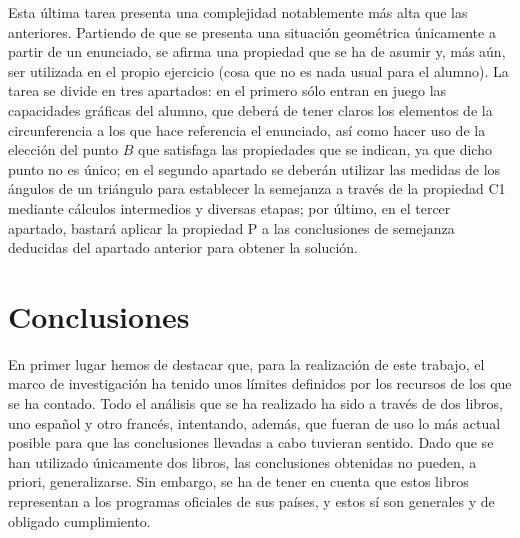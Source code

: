 	 Esta última tarea presenta una complejidad notablemente más alta que las anteriores. Partiendo de que se presenta una situación geométrica únicamente a partir de un enunciado, se afirma una propiedad que se ha de asumir y, más aún, ser utilizada en el propio ejercicio (cosa que no es nada usual para el alumno). La tarea se divide en tres apartados: en el primero sólo entran en juego las capacidades gráficas del alumno, que deberá de tener claros los elementos de la circunferencia a los que hace referencia el enunciado, así como hacer uso de la elección del punto $B$ que satisfaga las propiedades que se indican, ya que dicho punto no es único; en el segundo apartado se deberán utilizar las medidas de los ángulos de un triángulo para establecer la semejanza a través de la propiedad C1 mediante cálculos intermedios y diversas etapas; por último, en el tercer apartado, bastará aplicar la propiedad P a las conclusiones de semejanza deducidas del apartado anterior para obtener la solución.
	 
	 
	 
	 
	 

\section{Conclusiones}

	En primer lugar hemos de destacar que, para la realización de este trabajo, el marco de investigación ha tenido unos límites definidos por los recursos de los que se ha contado. Todo el análisis que se ha realizado ha sido a través de dos libros, uno español y otro francés, intentando, además, que fueran de uso lo más actual posible para que las conclusiones llevadas a cabo tuvieran sentido. Dado que se han utilizado únicamente dos libros, las conclusiones obtenidas no pueden, a priori, generalizarse. Sin embargo, se ha de tener en cuenta que estos libros representan a los programas oficiales de sus países, y estos sí son generales y de obligado cumplimiento. %

